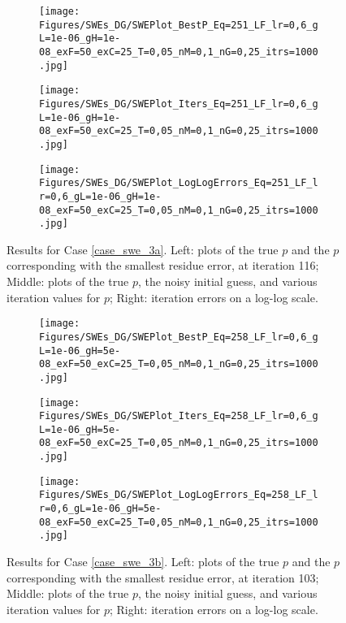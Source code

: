 \begin{figure}[h]
    \begin{subfigure}[t]{0.32\textwidth}
        \centering
        \texttt{[image: Figures/SWEs\_DG/SWEPlot\_BestP\_Eq=251\_LF\_lr=0,6\_gL=1e-06\_gH=1e-08\_exF=50\_exC=25\_T=0,05\_nM=0,1\_nG=0,25\_itrs=1000.jpg]}
    \end{subfigure}
    \begin{subfigure}[t]{0.32\textwidth}
        \centering
        \texttt{[image: Figures/SWEs\_DG/SWEPlot\_Iters\_Eq=251\_LF\_lr=0,6\_gL=1e-06\_gH=1e-08\_exF=50\_exC=25\_T=0,05\_nM=0,1\_nG=0,25\_itrs=1000.jpg]}
    \end{subfigure}
    \begin{subfigure}[t]{0.32\textwidth}
        \texttt{[image: Figures/SWEs\_DG/SWEPlot\_LogLogErrors\_Eq=251\_LF\_lr=0,6\_gL=1e-06\_gH=1e-08\_exF=50\_exC=25\_T=0,05\_nM=0,1\_nG=0,25\_itrs=1000.jpg]}
    \end{subfigure}
    \caption{Results for Case \eqref{case_swe_3a}. Left: plots of the true $p$ and the $p$ corresponding with the smallest residue error, at iteration 116; Middle: plots of the true $p$, the noisy initial guess, and various iteration values for $p$; Right: iteration errors on a log-log scale.}
    \label{fig:swe_3A}
\end{figure}

\begin{figure}[h]
    \begin{subfigure}[t]{0.32\textwidth}
        \centering
        \texttt{[image: Figures/SWEs\_DG/SWEPlot\_BestP\_Eq=258\_LF\_lr=0,6\_gL=1e-06\_gH=5e-08\_exF=50\_exC=25\_T=0,05\_nM=0,1\_nG=0,25\_itrs=1000.jpg]}
    \end{subfigure}
    \begin{subfigure}[t]{0.32\textwidth}
        \centering
        \texttt{[image: Figures/SWEs\_DG/SWEPlot\_Iters\_Eq=258\_LF\_lr=0,6\_gL=1e-06\_gH=5e-08\_exF=50\_exC=25\_T=0,05\_nM=0,1\_nG=0,25\_itrs=1000.jpg]}
    \end{subfigure}
    \begin{subfigure}[t]{0.32\textwidth}
        \texttt{[image: Figures/SWEs\_DG/SWEPlot\_LogLogErrors\_Eq=258\_LF\_lr=0,6\_gL=1e-06\_gH=5e-08\_exF=50\_exC=25\_T=0,05\_nM=0,1\_nG=0,25\_itrs=1000.jpg]}
    \end{subfigure}
    \caption{Results for Case \eqref{case_swe_3b}. Left: plots of the true $p$ and the $p$ corresponding with the smallest residue error, at iteration 103; Middle: plots of the true $p$, the noisy initial guess, and various iteration values for $p$; Right: iteration errors on a log-log scale.}
    \label{fig:swe_3B}
\end{figure}

